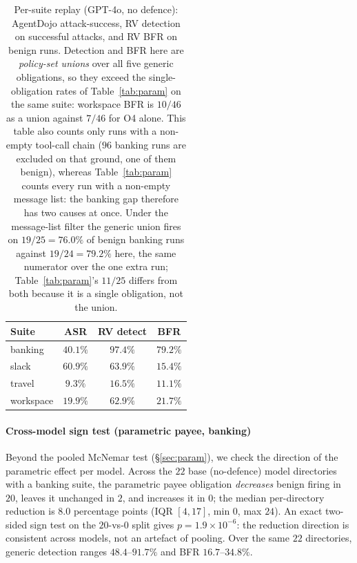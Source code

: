 \documentclass[sigconf]{acmart}
\begin{document}
\begin{table}[htbp]
\centering
\caption{Per-suite replay (GPT-4o, no defence): AgentDojo attack-success, RV detection
on successful attacks, and RV BFR on benign runs. Detection and BFR here are
\emph{policy-set unions} over all five generic obligations, so they exceed the
single-obligation rates of Table~\ref{tab:param} on the same suite: workspace BFR is
$10/46$ as a union against $7/46$ for O4 alone. This table also counts only runs with
a non-empty tool-call chain ($96$ banking runs are excluded on that ground, one of them
benign), whereas Table~\ref{tab:param} counts every run with a non-empty message list:
the banking gap therefore has two causes at once. Under the message-list filter the
generic union fires on $19/25=76.0\%$ of benign banking runs against $19/24=79.2\%$
here, the same numerator over the one extra run; Table~\ref{tab:param}'s $11/25$ differs
from both because it is a single obligation, not the union.}
\label{tab:suite}
\renewcommand{\arraystretch}{1.0}
\setlength{\tabcolsep}{6pt}
\small
\begin{tabular}{lccc}
\toprule
Suite & ASR & RV detect & BFR \\
\midrule
banking   & $40.1\%$ & $97.4\%$ & $79.2\%$ \\
slack     & $60.9\%$ & $63.9\%$ & $15.4\%$ \\
travel    & $9.3\%$  & $16.5\%$ & $11.1\%$ \\
workspace & $19.9\%$ & $62.9\%$ & $21.7\%$ \\
\bottomrule
\end{tabular}
\end{table}

\paragraph{Cross-model sign test (parametric payee, banking)} Beyond the pooled
McNemar test (\S\ref{sec:param}), we check the direction of the parametric effect
per model. Across the $22$ base (no-defence) model directories with a banking suite,
the parametric payee obligation \emph{decreases} benign firing in $20$, leaves it
unchanged in $2$, and increases it in $0$; the median per-directory reduction is
$8.0$ percentage points (IQR $[4,17]$, min $0$, max $24$). An exact two-sided sign
test on the $20$-vs-$0$ split gives $p=1.9\times10^{-6}$: the reduction direction is
consistent across models, not an artefact of pooling. Over the same $22$ directories,
generic detection ranges $48.4$--$91.7\%$ and BFR $16.7$--$34.8\%$.
\end{document}
